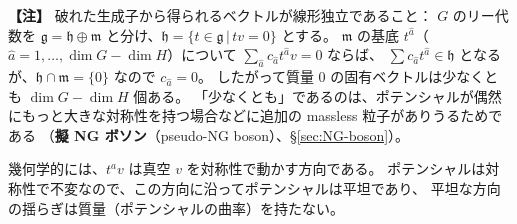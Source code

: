 \documentclass[uplatex,dvipdfmx,a4paper,11pt,openany]{jsbook}
\newcommand{\term}[2]{\textbf{#1}（#2）}
\newenvironment{note}{\vspace{1ex}\par\footnotesize\noindent\textbf{【注】}}{\par\vspace{1ex}}
\numberwithin{equation}{chapter}
\theoremstyle{definition}
\theoremstyle{plain}
\theoremstyle{remark}
\begin{document}
\begin{note}
破れた生成子から得られるベクトルが線形独立であること：
$G$ のリー代数を $\mathfrak g=\mathfrak h\oplus\mathfrak m$ と分け、$\mathfrak h=\{t\in\mathfrak g\,|\,tv=0\}$ とする。
$\mathfrak m$ の基底 $t^{\hat a}$（$\hat a=1,\dots,\dim G-\dim H$）について $\sum_{\hat a}c_{\hat a}t^{\hat a}v=0$ ならば、
$\sum c_{\hat a}t^{\hat a}\in\mathfrak h$ となるが、$\mathfrak h\cap\mathfrak m=\{0\}$ なので $c_{\hat a}=0$。
したがって質量 0 の固有ベクトルは少なくとも $\dim G-\dim H$ 個ある。
「少なくとも」であるのは、ポテンシャルが偶然にもっと大きな対称性を持つ場合などに追加の massless 粒子がありうるためである
（\term{擬 NG ボソン}{pseudo-NG boson}、\S\ref{sec:NG-boson}）。
\end{note}
幾何学的には、$t^av$ は真空 $v$ を対称性で動かす方向である。
ポテンシャルは対称性で不変なので、この方向に沿ってポテンシャルは平坦であり、
平坦な方向の揺らぎは質量（ポテンシャルの曲率）を持たない。
\end{document}
